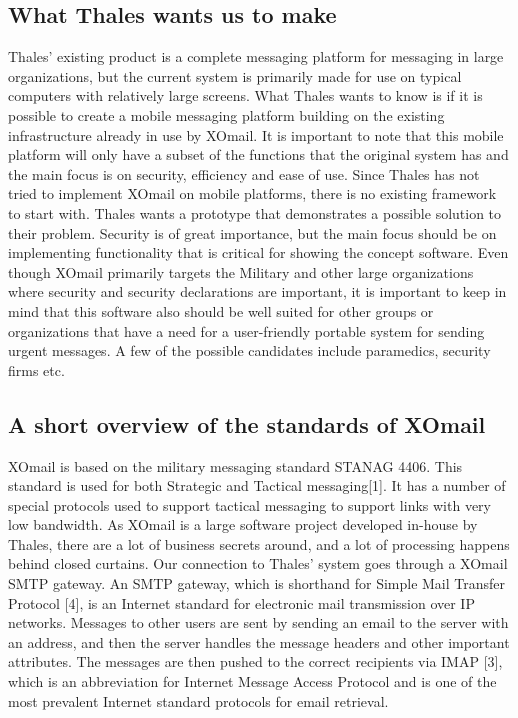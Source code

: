 \subsection*{What Thales wants us to make}
Thales’ existing product is a complete messaging platform for messaging in large organizations, but the current system is primarily made for use on typical computers with relatively large screens. What Thales wants to know is if it is possible to create a mobile messaging platform building on the existing infrastructure already in use by XOmail. It is important to note that this mobile platform will only have a subset of the functions that the original system has and the main focus is on security, efficiency and ease of use.
\newline
\newline
Since Thales has not tried to implement XOmail on mobile platforms, there is no existing framework to start with. Thales wants a prototype that demonstrates a possible solution to their problem. Security is of great importance, but the main focus should be on implementing functionality that is critical for showing the concept software.  
\newline
\newline
Even though XOmail primarily targets the Military and other large organizations where security and security declarations are important, it is important to keep in mind that this software also should be well suited for other groups or organizations that have a need for a user-friendly portable system for sending urgent messages. A few of the possible candidates include paramedics, security firms etc. 

\subsection*{A short overview of the standards of XOmail}
XOmail is based on the military messaging standard STANAG 4406. This standard is used for both Strategic and Tactical messaging[1]. It has a number of special protocols used to support tactical messaging to support links with very low bandwidth.
\newline
\newline
As XOmail is a large software project developed in-house by Thales, there are a lot of business secrets around, and a lot of processing happens behind closed curtains. Our connection to Thales’ system goes through a XOmail SMTP gateway. An SMTP gateway, which is shorthand for Simple Mail Transfer Protocol [4], is an Internet standard for electronic mail transmission over IP networks. Messages to other users are sent by sending an email to the server with an address, and then the server handles the message headers and other important attributes. The messages are then pushed to the correct recipients via IMAP [3], which is an abbreviation for Internet Message Access Protocol and is one of the most prevalent Internet standard protocols for email retrieval. 

